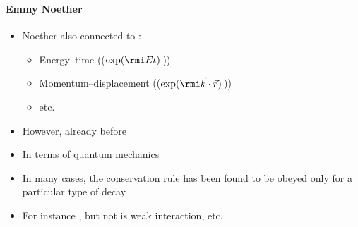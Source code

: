 \begin{frame}
\frametitle{\texorpdfstring{\culine[\sectiontitleulinecolor]{\sectiontitle}}{\sectiontitle} }
%
\framesubtitle{Emmy Noether}

\begin{itemize}
	 \item Noether also connected  to :
	\begin{itemize}
		 \item Energy–time (($\exp (\rmi E t)$\,))
		\item Momentum–displacement (($\exp (\rmi \vec{k} \cdot \vec{r})$\,))
		\item etc.
	\end{itemize}
	
	\item However, already before 
	
	\item In terms of quantum mechanics
	
	\item In many cases, the conservation rule has been found to be obeyed only for a particular type of decay 
	
	\item For instance  , but not is weak interaction, etc.
\end{itemize}

\endofslide 
\end{frame}


